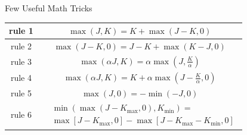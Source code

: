 \documentclass{beamer}
\begin{document}
\begin{frame}{Few Useful Math Tricks}
\renewcommand{\arraystretch}{1.4}
\begin{table}[bt]
	\begin{tabular}{|c|c|} \hline
		rule 1 & $\max(J,K) = K + \max(J-K, 0)$\\ \hline		
		rule 2 & $\max(J-K,0) = J-K + \max(K-J, 0)$\\ \hline		
		rule 3 & $\max(\alpha J,K) = \alpha \max(J,\frac{K}{\alpha})$\\ \hline		
		rule 4 & $\max(\alpha J,K) = K + \alpha\max(J-\frac{K}{\alpha}, 0)$\\ \hline		
		rule 5 & $\max(J,0) = -\min(-J,0)$\\ \hline		
		rule 6 & $\begin{aligned}&\min(\max(J-K_{\max}, 0), K_{\min}) =\\ &\max[J-K_{\max},0]-\max[J-K_{\max}-K_{\min},0]\end{aligned}$\\ \hline		
	\end{tabular}
\end{table}
\end{frame}

\end{document}
